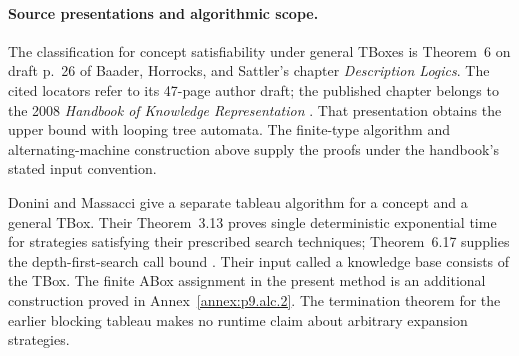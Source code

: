 \paragraph{Source presentations and algorithmic scope.}
The classification for concept satisfiability under general TBoxes is
Theorem~6 on draft p.~26 of Baader, Horrocks, and Sattler's chapter
\emph{Description Logics}.  The cited locators refer to its 47-page author
draft; the published chapter belongs to the 2008
\emph{Handbook of Knowledge Representation}
\cite[draft \S3.6.1, Proposition~5 and Theorem~6]{BaaderHorrocksSattler2008}.
That presentation obtains the upper bound with looping tree automata.
The finite-type algorithm and alternating-machine construction above
supply the proofs under the handbook's stated input convention.

Donini and Massacci give a separate tableau algorithm for a concept and
a general TBox.  Their Theorem~3.13 proves single deterministic
exponential time for strategies satisfying their prescribed search
techniques; Theorem~6.17 supplies the depth-first-search call bound
\cite[pp.~98, 123]{DoniniMassacci2000}.
Their input called a knowledge base consists of the TBox.
The finite ABox assignment in the present method is an additional
construction proved in Annex~\ref{annex:p9.alc.2}.
The termination theorem for the earlier blocking tableau makes no
runtime claim about arbitrary expansion strategies.
